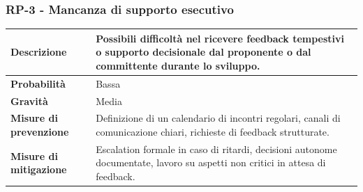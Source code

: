 \documentclass[11pt,a4paper]{article}
\begin{document}
\subsubsection{RP-3 - Mancanza di supporto esecutivo}
\begin{center}
\begin{tabular}{|p{3cm}|p{12cm}|}
    \hline
    \textbf{Descrizione} & Possibili difficoltà nel ricevere feedback tempestivi o supporto decisionale dal proponente o dal committente durante lo sviluppo. \\
    \hline
    \textbf{Probabilità} & Bassa \\
    \hline
    \textbf{Gravità} & Media \\
    \hline
    \textbf{Misure di prevenzione} & Definizione di un calendario di incontri regolari, canali di comunicazione chiari, richieste di feedback strutturate. \\
    \hline
    \textbf{Misure di mitigazione} & Escalation formale in caso di ritardi, decisioni autonome documentate, lavoro su aspetti non critici in attesa di feedback. \\
    \hline
\end{tabular}
\end{center}

\end{document}
